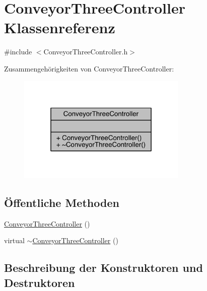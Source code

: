 \hypertarget{class_conveyor_three_controller}{}\section{Conveyor\+Three\+Controller Klassenreferenz}
\label{class_conveyor_three_controller}


{\ttfamily \#include $<$Conveyor\+Three\+Controller.\+h$>$}



Zusammengehörigkeiten von Conveyor\+Three\+Controller\+:
\nopagebreak
\begin{figure}[H]
\begin{center}
\leavevmode
\includegraphics[width=229pt]{class_conveyor_three_controller__coll__graph}
\end{center}
\end{figure}
\subsection*{Öffentliche Methoden}
\begin{DoxyCompactItemize}
\item 
\hyperlink{class_conveyor_three_controller_ad35c62e9764dc39314521c3b7e451eb4}{Conveyor\+Three\+Controller} ()
\item 
virtual \hyperlink{class_conveyor_three_controller_a3ea9a30cb49da76384b3633d11240c92}{$\sim$\+Conveyor\+Three\+Controller} ()
\end{DoxyCompactItemize}


\subsection{Beschreibung der Konstruktoren und Destruktoren}
\hypertarget{class_conveyor_three_controller_ad35c62e9764dc39314521c3b7e451eb4}{}\label{class_conveyor_three_controller_ad35c62e9764dc39314521c3b7e451eb4} 
